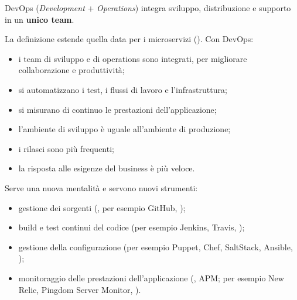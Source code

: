 \begin{definizione}[DevOps]
DevOps (\emph{Development} + \emph{Operations}) integra sviluppo, distribuzione e supporto in un
\textbf{unico team}.
\end{definizione}

La definizione estende quella data per i microservizi (). Con DevOps:
\begin{itemize}
  \item i team di sviluppo e di operations sono integrati, per migliorare collaborazione e produttività;
  \item si automatizzano i test, i flussi di lavoro e l'infrastruttura;
  \item si misurano di continuo le prestazioni dell'applicazione;
  \item l'ambiente di sviluppo è uguale all'ambiente di produzione;
  \item i rilasci sono più frequenti;
  \item la risposta alle esigenze del business è più veloce.
\end{itemize}
Serve una nuova mentalità e servono nuovi strumenti:
\begin{itemize}
  \item gestione dei sorgenti (, per esempio GitHub, );
  \item build e test continui del codice (per esempio Jenkins, Travis, );
  \item gestione della configurazione (per esempio Puppet, Chef, SaltStack, Ansible, );
  \item monitoraggio delle prestazioni dell'applicazione (, APM; per esempio
    New Relic, Pingdom Server Monitor, ).
\end{itemize}

